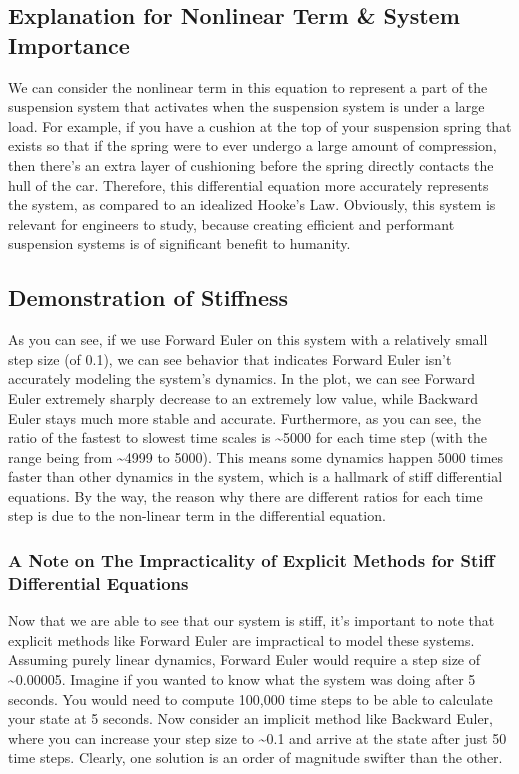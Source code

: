 \documentclass[11pt]{article}
\begin{document}
\subsection{Explanation for Nonlinear Term \& System
Importance}\label{explanation-for-nonlinear-term-system-importance}

We can consider the nonlinear term in this equation to represent a part
of the suspension system that activates when the suspension system is
under a large load. For example, if you have a cushion at the top of
your suspension spring that exists so that if the spring were to ever
undergo a large amount of compression, then there's an extra layer of
cushioning before the spring directly contacts the hull of the car.
Therefore, this differential equation more accurately represents the
system, as compared to an idealized Hooke's Law. Obviously, this system
is relevant for engineers to study, because creating efficient and
performant suspension systems is of significant benefit to humanity.

\subsection{Demonstration of
Stiffness}\label{demonstration-of-stiffness}

As you can see, if we use Forward Euler on this system with a relatively
small step size (of 0.1), we can see behavior that indicates Forward
Euler isn't accurately modeling the system's dynamics. In the plot, we
can see Forward Euler extremely sharply decrease to an extremely low
value, while Backward Euler stays much more stable and accurate.
Furthermore, as you can see, the ratio of the fastest to slowest time
scales is \textasciitilde5000 for each time step (with the range being
from \textasciitilde4999 to 5000). This means some dynamics happen 5000
times faster than other dynamics in the system, which is a hallmark of
stiff differential equations. By the way, the reason why there are
different ratios for each time step is due to the non-linear term in the
differential equation.

\subsubsection{A Note on The Impracticality of Explicit Methods for
Stiff Differential
Equations}\label{a-note-on-the-impracticality-of-explicit-methods-for-stiff-differential-equations}

Now that we are able to see that our system is stiff, it's important to
note that explicit methods like Forward Euler are impractical to model
these systems. Assuming purely linear dynamics, Forward Euler would
require a step size of \textasciitilde0.00005. Imagine if you wanted to
know what the system was doing after 5 seconds. You would need to
compute 100,000 time steps to be able to calculate your state at 5
seconds. Now consider an implicit method like Backward Euler, where you
can increase your step size to \textasciitilde0.1 and arrive at the
state after just 50 time steps. Clearly, one solution is an order of
magnitude swifter than the other.
\end{document}
